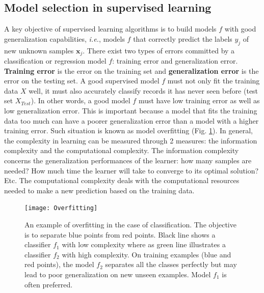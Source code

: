 \subsection{Model selection in supervised learning}
\label{sec:model_selection}
A key objective of supervised learning algorithms is to build models $f$ with good generalization capabilities, \textit{i.e.}, models $f$ that correctly predict the labels $y_j$ of new unknown samples $\textbf{x}_j$. There exist two types of errors committed by a classification or regression model $f$: training error and generalization error. \textbf{Training error} is the error on the training set and \textbf{generalization error} is the error on the testing set. A good supervised model $f$ must not only fit the training data $X$ well, it must also accurately classify records it has never seen before (test set $X_{Test}$). In other words, a good model $f$ must have low training error as well as low generalization error. This is important because a model that fits the training data too much can have a poorer generalization error than a model with a higher training error. Such situation is known as model overfitting (Fig. \ref{fig:Overfitting}). In general, the complexity in learning can be measured through 2 measures: the information complexity and the computational complexity. The information complexity concerns the generalization performances of the learner: how many samples are needed? How much time the learner will take to converge to its optimal solution? Etc. The computational complexity deals with the computational resources needed to make a new prediction based on the training data.

\begin{figure}[h!]
	\centering
	\texttt{[image: Overfitting]}
	\caption[An example of overfitting in the case of classification.]{An example of overfitting in the case of classification. The objective is to separate blue points from red points. Black line shows a classifier $f_1$ with low complexity where as green line illustrates a classifier $f_2$ with high complexity. On training examples (blue and red points), the model $f_2$ separates all the classes perfectly but may lead to poor generalization on new unseen examples. Model $f_1$ is often preferred.}
	\label{fig:Overfitting}
\end{figure}

